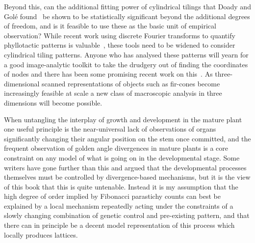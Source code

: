 Beyond this, can the additional fitting power of cylindrical tilings that Doady and Golé found~\cite{douadyFibonacciQuasisymmetricPhyllotaxis2016} be shown to be statistically significant beyond the additional degrees of freedom, and is it feasible to use these as the basic unit of empirical observation? While recent work using discrete Fourier transforms to quantify phyllotactic patterns is valuable~\cite{negishiDeterminingParastichyPairs2022}, these tools need to be widened to consider cylindrical tiling patterns. Anyone who has analysed these patterns will yearn for a good image-analytic toolkit to take the drudgery out of finding the coordinates of nodes and there has been some promising recent work on this~\cite{aliyevMathematicalModelPlacement2023,aliyevStudyDistributionPhenotypic2024}.  As three-dimensional scanned representations of objects such as fir-cones become increasingly feasible at scale a new class of macroscopic analysis in three dimensions will become possible. 
 

When untangling the interplay of growth and development in the mature plant one useful principle is the near-universal lack of observations of organs significantly changing their angular position on the stem once committed, and the frequent observation of golden angle divergences in mature plants is a core constraint on any model of what is going on in the developmental stage. Some writers have gone further than this and argued that the developmental processes themselves must be controlled by divergence-based mechanisms, but it is the view of this book that this is quite untenable.  Instead it is my assumption that the high degree of order implied by Fibonacci parastichy counts can best be explained by a local mechanism repeatedly acting under the constraints of a slowly changing combination of genetic control and pre-existing pattern, and that there can in principle be a decent model representation of this process which locally produces lattices. 

